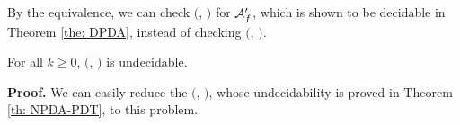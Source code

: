 By the equivalence, we can check \Real $($\DPDA, \PDT$)$ for ${\cal A}'_f$,
which is shown to be decidable in Theorem \ref{the: DPDA}, instead of checking \Real $($\DRPDAv, \RPDTk$)$.




\begin{theorem}
For all $k\geq 0$, \Real $($\NRPDA, \RPDTk$)$ is undecidable.
\end{theorem}
{\bf Proof.}\quad
We can easily reduce the \Real $($\NPDA, \PDT$)$,
whose undecidability is proved in Theorem \ref{th: NPDA-PDT}, to this problem.


%
